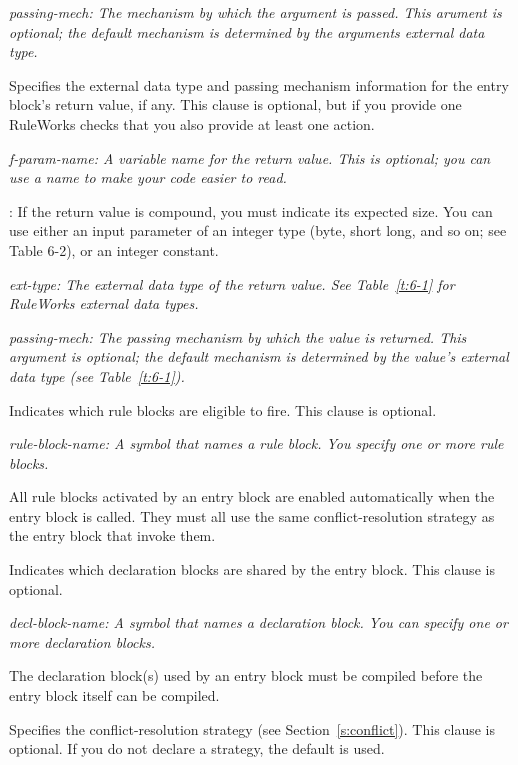 \it{passing-mech}: The mechanism by which the argument is passed.
This arument is optional; the default mechanism is determined by the
arguments external data type.


Specifies the external data type and passing mechanism
information for the entry block's return value, if any. This
clause is optional, but if you provide one RuleWorks checks
that you also provide at least one  action.

\it{f-param-name}: A variable name for the return value. This is optional; you can use a name to make
your code easier to read.

\co[\it{size}\co]: If the return value is compound, you must indicate
its expected size. You can use either an input parameter of an integer
type (byte, short long, and so on; see Table 6-2), or an integer
constant.

\it{ext-type}: The external data type of the return value. See
Table~\ref{t:6-1} for RuleWorks external data types.

\it{passing-mech}: The passing mechanism by which the value is
returned. This argument is optional; the default mechanism is
determined by the value's external data type (see Table~\ref{t:6-1}).


Indicates which rule blocks are eligible to fire. This clause
is optional.

\it{rule-block-name}: A symbol that names a rule block. You specify
one or more rule blocks.

All rule blocks activated by an entry block are enabled automatically
when the entry block is called. They must all use the same
conflict-resolution strategy as the entry block that invoke them.


Indicates which declaration blocks are shared by the entry
block. This clause is optional.

\it{decl-block-name}: A symbol that names a declaration block.  You
can specify one or more declaration blocks.

The declaration block(s) used by an entry block must be
compiled before the entry block itself can be compiled.


Specifies the conflict-resolution strategy (see Section~\ref{s:conflict}).
This clause is optional. If you do not declare a strategy,
the default  is used.

